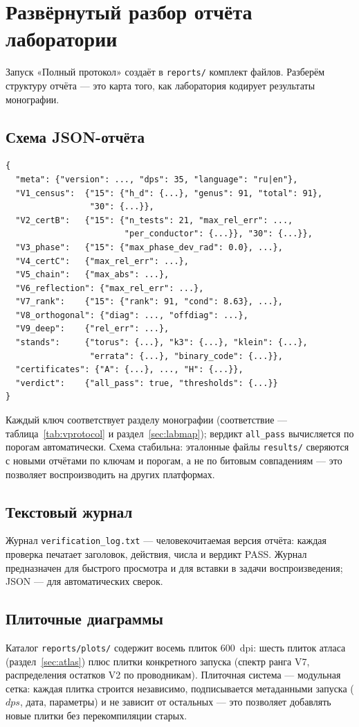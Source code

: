 \section{Развёрнутый разбор отчёта лаборатории}\label{sec:reportwalk}

Запуск «Полный протокол» создаёт в \texttt{reports/} комплект
файлов. Разберём структуру отчёта --- это карта того, как
лаборатория кодирует результаты монографии.

\subsection{Схема JSON-отчёта}

\begin{verbatim}
{
  "meta": {"version": ..., "dps": 35, "language": "ru|en"},
  "V1_census":  {"15": {"h_d": {...}, "genus": 91, "total": 91},
                 "30": {...}},
  "V2_certB":   {"15": {"n_tests": 21, "max_rel_err": ...,
                        "per_conductor": {...}}, "30": {...}},
  "V3_phase":   {"15": {"max_phase_dev_rad": 0.0}, ...},
  "V4_certC":   {"max_rel_err": ...},
  "V5_chain":   {"max_abs": ...},
  "V6_reflection": {"max_rel_err": ...},
  "V7_rank":    {"15": {"rank": 91, "cond": 8.63}, ...},
  "V8_orthogonal": {"diag": ..., "offdiag": ...},
  "V9_deep":    {"rel_err": ...},
  "stands":     {"torus": {...}, "k3": {...}, "klein": {...},
                 "errata": {...}, "binary_code": {...}},
  "certificates": {"A": {...}, ..., "H": {...}},
  "verdict":    {"all_pass": true, "thresholds": {...}}
}
\end{verbatim}

Каждый ключ соответствует разделу монографии
(соответствие --- таблица~\ref{tab:vprotocol} и
раздел~\ref{sec:labmap}); вердикт \texttt{all\_pass}
вычисляется по порогам автоматически. Схема стабильна:
эталонные файлы \texttt{results/} сверяются с новыми отчётами
по ключам и порогам, а не по битовым совпадениям --- это
позволяет воспроизводить на других платформах.

\subsection{Текстовый журнал}

Журнал \texttt{verification\_log.txt} --- человекочитаемая версия
отчёта: каждая проверка печатает заголовок, действия, числа и
вердикт PASS. Журнал предназначен для быстрого просмотра и для
вставки в задачи воспроизведения; JSON --- для автоматических
сверок.

\subsection{Плиточные диаграммы}

Каталог \texttt{reports/plots/} содержит восемь плиток $600$~dpi:
шесть плиток атласа (раздел~\ref{sec:atlas}) плюс плитки
конкретного запуска (спектр ранга V7, распределения остатков V2 по
проводникам). Плиточная система --- модульная сетка: каждая плитка
строится независимо, подписывается метаданными запуска
($dps$, дата, параметры) и не зависит от остальных --- это
позволяет добавлять новые плитки без перекомпиляции старых.
